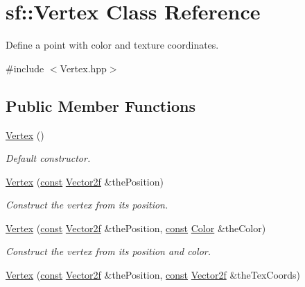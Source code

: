 \hypertarget{classsf_1_1_vertex}{\section{sf\-:\-:Vertex Class Reference}
\label{classsf_1_1_vertex}
}


Define a point with color and texture coordinates.  




{\ttfamily \#include $<$Vertex.\-hpp$>$}

\subsection*{Public Member Functions}
\begin{DoxyCompactItemize}
\item 
\hyperlink{classsf_1_1_vertex_a6b4c79cd69f7ec1296fede536f39e9c8}{Vertex} ()
\begin{DoxyCompactList}\small\item\em Default constructor. \end{DoxyCompactList}\item 
\hyperlink{classsf_1_1_vertex_a4dccc5c351b73b6fac169fe442535b40}{Vertex} (\hyperlink{term__entry_8h_a57bd63ce7f9a353488880e3de6692d5a}{const} \hyperlink{namespacesf_a80cea3c46537294fd1d8d428566ad8b2}{Vector2f} \&the\-Position)
\begin{DoxyCompactList}\small\item\em Construct the vertex from its position. \end{DoxyCompactList}\item 
\hyperlink{classsf_1_1_vertex_a70b0679b4ec531d5bd1a7d0225c7321a}{Vertex} (\hyperlink{term__entry_8h_a57bd63ce7f9a353488880e3de6692d5a}{const} \hyperlink{namespacesf_a80cea3c46537294fd1d8d428566ad8b2}{Vector2f} \&the\-Position, \hyperlink{term__entry_8h_a57bd63ce7f9a353488880e3de6692d5a}{const} \hyperlink{classsf_1_1_color}{Color} \&the\-Color)
\begin{DoxyCompactList}\small\item\em Construct the vertex from its position and color. \end{DoxyCompactList}\item 
\hyperlink{classsf_1_1_vertex_ab9bf849c4c0d82d09bf5bece23d2456a}{Vertex} (\hyperlink{term__entry_8h_a57bd63ce7f9a353488880e3de6692d5a}{const} \hyperlink{namespacesf_a80cea3c46537294fd1d8d428566ad8b2}{Vector2f} \&the\-Position, \hyperlink{term__entry_8h_a57bd63ce7f9a353488880e3de6692d5a}{const} \hyperlink{namespacesf_a80cea3c46537294fd1d8d428566ad8b2}{Vector2f} \&the\-Tex\-Coords)

\end{DoxyCompactItemize}
